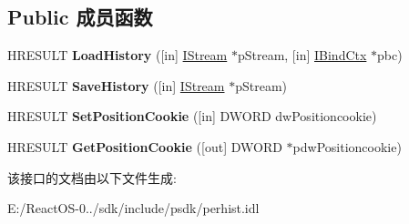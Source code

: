 \subsection*{Public 成员函数}
\begin{DoxyCompactItemize}
\item 
\mbox{\label{interface_i_persist_history_ad18937e0ab2b0612913c1a540ad428ea}} 
H\+R\+E\+S\+U\+LT {\bfseries Load\+History} (\mbox{[}in\mbox{]} \hyperlink{interface_i_stream}{I\+Stream} $\ast$p\+Stream, \mbox{[}in\mbox{]} \hyperlink{interface_i_bind_ctx}{I\+Bind\+Ctx} $\ast$pbc)
\item 
\mbox{\label{interface_i_persist_history_a296c5491fd1d829524ea0cdb8a9f1e95}} 
H\+R\+E\+S\+U\+LT {\bfseries Save\+History} (\mbox{[}in\mbox{]} \hyperlink{interface_i_stream}{I\+Stream} $\ast$p\+Stream)
\item 
\mbox{\label{interface_i_persist_history_a558e5f28aadab7516cf43f7a7134a795}} 
H\+R\+E\+S\+U\+LT {\bfseries Set\+Position\+Cookie} (\mbox{[}in\mbox{]} D\+W\+O\+RD dw\+Positioncookie)
\item 
\mbox{\label{interface_i_persist_history_a938609d7b079860c0ae5f6115bd7aedb}} 
H\+R\+E\+S\+U\+LT {\bfseries Get\+Position\+Cookie} (\mbox{[}out\mbox{]} D\+W\+O\+RD $\ast$pdw\+Positioncookie)
\end{DoxyCompactItemize}


该接口的文档由以下文件生成\+:\begin{DoxyCompactItemize}
\item 
E\+:/\+React\+O\+S-\/0../sdk/include/psdk/perhist.\+idl\end{DoxyCompactItemize}
